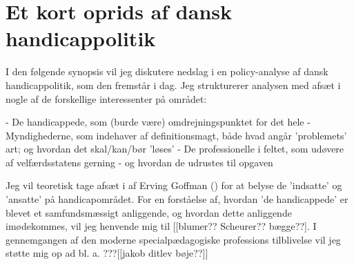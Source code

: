 \section{Et kort oprids af dansk handicappolitik}

I den følgende synopsis vil jeg diskutere nedslag i en policy-analyse af dansk handicappolitik, som den fremstår i dag.
Jeg strukturerer analysen med afsæt i nogle af de forskellige interessenter på området:

- De handicappede, som (burde være) omdrejningspunktet for det hele
- Myndighederne, som indehaver af definitionsmagt, både hvad angår 'problemets' art; og hvordan det skal/kan/bør 'løses'
- De professionelle i feltet, som udøvere af velfærdsstatens gerning - og hvordan de udrustes til opgaven

Jeg vil teoretisk tage afsæt i  af Erving Goffman (\citeyear{goffmanAsylumsEssaysSocial1991}) for at belyse de 'indsatte' og 'ansatte' på handicapområdet.
For en forståelse af, hvordan 'de handicappede' er blevet et samfundsmæssigt anliggende, og hvordan dette anliggende imødekommes, vil jeg henvende mig til [[blumer?? Scheurer?? bægge??].
I gennemgangen af den moderne specialpædagogiske professions tilblivelse vil jeg støtte mig op ad bl. a. ???[[jakob ditlev bøje??]]
